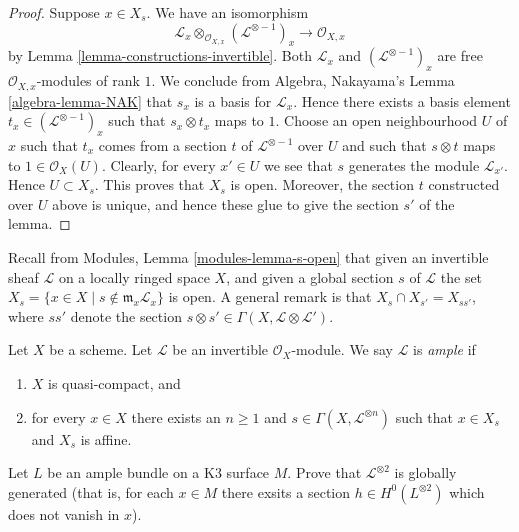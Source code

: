 \begin{proof}
Suppose $x \in X_s$.
We have an isomorphism
$$
\mathcal{L}_x \otimes_{\mathcal{O}_{X, x}} (\mathcal{L}^{\otimes -1})_x
\longrightarrow
\mathcal{O}_{X, x}
$$
by Lemma \ref{lemma-constructions-invertible}.
Both $\mathcal{L}_x$ and $(\mathcal{L}^{\otimes -1})_x$
are free $\mathcal{O}_{X, x}$-modules of rank $1$. We conclude
from Algebra, Nakayama's Lemma \ref{algebra-lemma-NAK} that
$s_x$ is a basis for $\mathcal{L}_x$. Hence there exists
a basis element $t_x \in (\mathcal{L}^{\otimes -1})_x$
such that $s_x \otimes t_x$ maps to $1$.
Choose an open neighbourhood $U$ of
$x$ such that $t_x$ comes from a section $t$
of $\mathcal{L}^{\otimes -1}$ over $U$ and such that
$s \otimes t$ maps to $1 \in \mathcal{O}_X(U)$.
Clearly, for every $x' \in U$ we see that $s$ generates
the module $\mathcal{L}_{x'}$. Hence $U \subset X_s$.
This proves that $X_s$ is open. Moreover, the section
$t$ constructed over $U$ above is unique, and hence
these glue to give the section $s'$ of the lemma.
\end{proof}

Recall from Modules, Lemma \ref{modules-lemma-s-open}
that given an invertible sheaf $\mathcal{L}$ on a locally ringed
space $X$, and given a global section $s$ of $\mathcal{L}$
the set $X_s = \{x \in X \mid s \not \in \mathfrak m_x\mathcal{L}_x\}$
is open. A general remark is that
$X_s \cap X_{s'} = X_{ss'}$, where $ss'$ denote
the section $s \otimes s' \in \Gamma(X, \mathcal{L} \otimes \mathcal{L}')$.

\begin{definition}
\label{definition-ample}
\begin{reference}
\cite[II Definition 4.5.3]{EGA}
\end{reference}
Let $X$ be a scheme.
Let $\mathcal{L}$ be an invertible $\mathcal{O}_X$-module.
We say $\mathcal{L}$ is {\it ample} if
\begin{enumerate}
\item $X$ is quasi-compact, and
\item for every $x \in X$ there exists an $n \geq 1$
and $s \in \Gamma(X, \mathcal{L}^{\otimes n})$ such
that $x \in X_s$ and $X_s$ is affine.
\end{enumerate}
\end{definition}

\begin{exercise}
\label{exercise-ample-bundle-on-K3}
Let $L$ be an ample bundle on a K3 surface $M$. Prove that
$\mathcal{L}^{\otimes 2}$ is globally generated (that is, for each $x\in M$
there exsits a section $h \in H^{0}(L^{\otimes 2})$ which does not vanish in
$x$).
\end{exercise}

